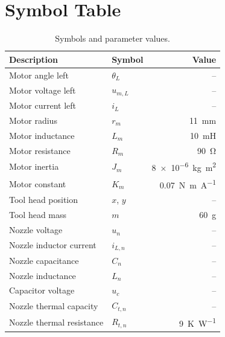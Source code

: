 \section{Symbol Table}
\label{sec:symbol_table}

\begin{table}[H]
  \centering
  \caption{Symbols and parameter values.}
  \label{tab:symbols}
  \begin{tabular}{llr}
    \toprule
    Description & Symbol & Value \\
    \midrule
    Motor angle left                  & $\theta_L$      & -- \\
    Motor voltage left                & $u_{m,L}$       & -- \\
    Motor current left                & $i_L$           & -- \\
    Motor radius                      & $r_m$           & \qty{11}{\milli\metre} \\
    Motor inductance                  & $L_m$           & \qty{10}{\milli\henry} \\
    Motor resistance                  & $R_m$           & \qty{90}{\ohm} \\
    Motor inertia                     & $J_m$           & \qty{8e-6}{\kilogram\metre\squared} \\
    Motor constant                    & $K_m$           & \qty{0.07}{\newton\metre\per\ampere} \\
    \midrule
    Tool head position                & $x$, $y$        & -- \\
    Tool head mass                    & $m$             & \qty{60}{\gram} \\
    \midrule
    Nozzle voltage                    & $u_n$           & -- \\
    Nozzle inductor current           & $i_{L,n}$       & -- \\
    Nozzle capacitance                & $C_n$           & -- \\
    Nozzle inductance                 & $L_n$           & -- \\
    Capacitor voltage                 & $u_c$           & -- \\
    Nozzle thermal capacity           & $C_{t,n}$       & -- \\
    Nozzle thermal resistance         & $R_{t,n}$       & \qty{9}{\kelvin\per\watt} \\

\end{tabular}
\end{table}
